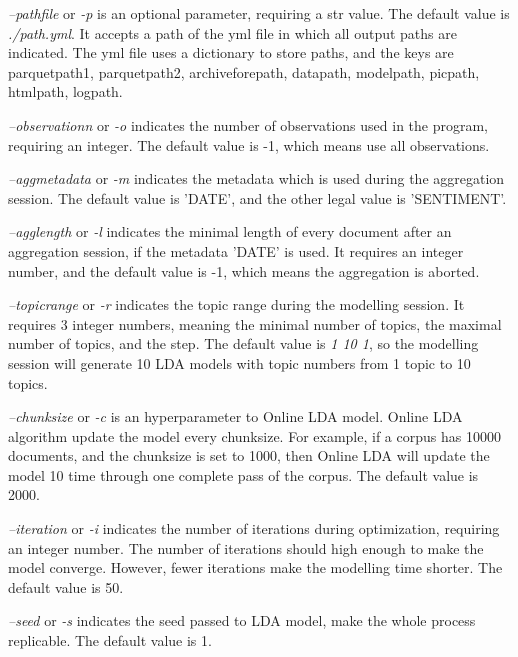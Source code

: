 \documentclass{article} %
\begin{document}
    \textit{--path\textunderscore{}file} or \textit{-p} is an optional parameter, requiring a str value. The default value is \textit{./path.yml}. It accepts a path of the yml file in which all output paths are indicated. The yml file uses a dictionary to store paths, and the keys are parquet\textunderscore{}path1,
    parquet\textunderscore{}path2,
    archive\textunderscore{}fore\textunderscore{}path,
    data\textunderscore{}path,
    model\textunderscore{}path,
    pic\textunderscore{}path,
    html\textunderscore{}path,
    log\textunderscore{}path.

    \textit{--observation\textunderscore{}n} or \textit{-o} indicates the number of observations used in the program, requiring an integer. The default value is -1, which means use all observations.

    \textit{--agg\textunderscore{}metadata} or \textit{-m} indicates the metadata which is used during the aggregation session. The default value is 'DATE', and the other legal value is 'SENTIMENT'.

    \textit{--agg\textunderscore{}length} or \textit{-l} indicates the minimal length of every document after an aggregation session, if the metadata 'DATE' is used. It requires an integer number, and the default value is -1, which means the aggregation is aborted.

    \textit{--topic\textunderscore{}range} or \textit{-r} indicates the topic range during the modelling session. It requires 3 integer numbers, meaning the minimal number of topics, the maximal number of topics, and the step. The default value is \textit{1 10 1}, so the modelling session will generate 10 LDA models with topic numbers from 1 topic to 10 topics.

    \textit{--chunksize} or \textit{-c} is an hyperparameter to Online LDA model. Online LDA algorithm update the model every chunksize. For example, if a corpus has 10000 documents, and the chunksize is set to 1000, then Online LDA will update the model 10 time through one complete pass of the corpus. The default value is 2000.

    \textit{--iteration} or \textit{-i} indicates the number of iterations during optimization, requiring an integer number. The number of iterations should high enough to make the model converge. However, fewer iterations make the modelling time shorter. The default value is 50.

    \textit{--seed} or \textit{-s} indicates the seed passed to LDA model, make the whole process replicable. The default value is 1.
\end{document}
